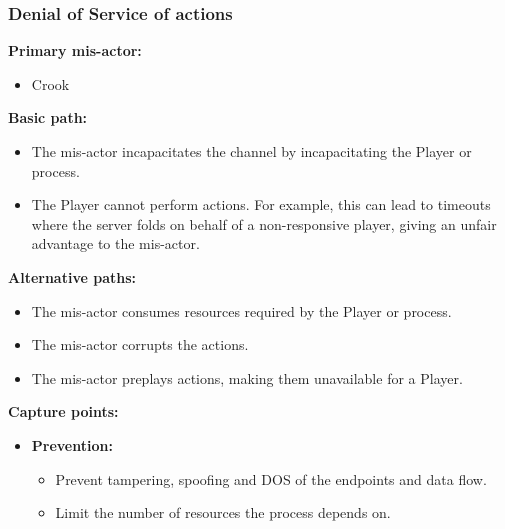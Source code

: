 \documentclass[a4paper,11pt]{report}
\begin{document}
\subsubsection{Denial of Service of actions}
\textbf{Primary mis-actor:}
\begin{itemize}
\item Crook
\end{itemize}
\textbf{Basic path:}
\begin{itemize}
\item The mis-actor incapacitates the channel by incapacitating the Player or process.
\item The Player cannot perform actions. For example, this can lead to timeouts where the server folds on behalf of a non-responsive player, giving an unfair advantage to the mis-actor.
\end{itemize}
\textbf{Alternative paths:}
\begin{itemize}
\item The mis-actor consumes resources required by the Player or process.
\item The mis-actor corrupts the actions.
\item The mis-actor preplays actions, making them unavailable for a Player.
\end{itemize}
\textbf{Capture points:}
\begin{itemize}
\item \textbf{Prevention:}
\begin{itemize}
\item Prevent tampering, spoofing and DOS of the endpoints and data flow.
\item Limit the number of resources the process depends on.
\end{itemize}
\end{itemize}
\end{document}
